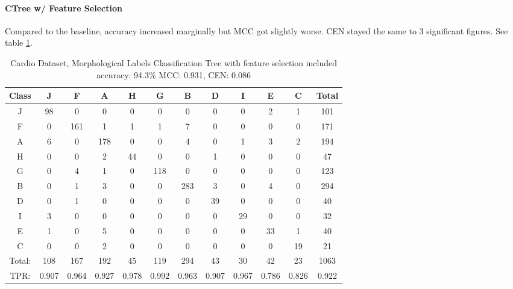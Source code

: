 \paragraph{CTree w/ Feature Selection}
Compared to the baseline, accuracy increased marginally but MCC got slightly worse.  CEN stayed the same to 3 significant figures.  See table \ref{tab:cardiomorphctree}.
\begin{table}
	\centering	
	\begin{tabular}{|c|c|c|c|c|c|c|c|c|c|c|c|}
	\hline
	Class&J&F&A&H&G&B&D&I&E&C&Total\\
	\hline
	J&98&0&0&0&0&0&0&0&2&1&101\\
	F&0&161&1&1&1&7&0&0&0&0&171\\
	A&6&0&178&0&0&4&0&1&3&2&194\\
	H&0&0&2&44&0&0&1&0&0&0&47\\
	G&0&4&1&0&118&0&0&0&0&0&123\\
	B&0&1&3&0&0&283&3&0&4&0&294\\
	D&0&1&0&0&0&0&39&0&0&0&40\\
	I&3&0&0&0&0&0&0&29&0&0&32\\
	E&1&0&5&0&0&0&0&0&33&1&40\\
	C&0&0&2&0&0&0&0&0&0&19&21\\\hline
	Total:&108&167&192&45&119&294&43&30&42&23&1063\\
	TPR:&0.907&0.964&0.927&0.978&0.992&0.963&0.907&0.967&0.786&0.826&0.922\\
	\hline
\end{tabular}
	\caption[Cardiotocology Morphology: Classification Tree Confusion Matrix]{Cardio Dataset, Morphological Labels Classification Tree with feature selection included accuracy: 94.3\% MCC: 0.931, CEN: 0.086}
	\label{tab:cardiomorphctree}
\end{table}
